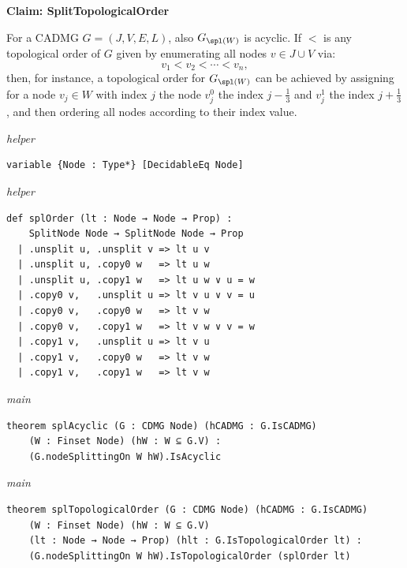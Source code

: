 \noindent\textbf{Claim: SplitTopologicalOrder}\par\smallskip
{\appendixTexSize
    For a CADMG $G=(J,V,E,L)$, also $G_{\spl(W)}$ is acyclic.
    If $<$ is any topological order of $G$ given by enumerating all nodes $v \in J \cup V$ via:
    \[ v_1 < v_2 < \cdots < v_n,\]
    then, for instance, 
    a topological order for $G_{\spl(W)}$ can be achieved by assigning for a node $v_j \in W$ with index $j$ the node 
    $v_j^0$ the index $j-\frac{1}{3}$
    and $v_j^1$ the index $j+\frac{1}{3}$, and then ordering all nodes according to their index value.
\par}
\smallskip
{\small\textit{helper}}
\begin{verbatim}
variable {Node : Type*} [DecidableEq Node]
\end{verbatim}
{\small\textit{helper}}
\begin{verbatim}
def splOrder (lt : Node → Node → Prop) :
    SplitNode Node → SplitNode Node → Prop
  | .unsplit u, .unsplit v => lt u v
  | .unsplit u, .copy0 w   => lt u w
  | .unsplit u, .copy1 w   => lt u w ∨ u = w
  | .copy0 v,   .unsplit u => lt v u ∨ v = u
  | .copy0 v,   .copy0 w   => lt v w
  | .copy0 v,   .copy1 w   => lt v w ∨ v = w
  | .copy1 v,   .unsplit u => lt v u
  | .copy1 v,   .copy0 w   => lt v w
  | .copy1 v,   .copy1 w   => lt v w
\end{verbatim}
{\small\textit{main}}
\begin{verbatim}
theorem splAcyclic (G : CDMG Node) (hCADMG : G.IsCADMG)
    (W : Finset Node) (hW : W ⊆ G.V) :
    (G.nodeSplittingOn W hW).IsAcyclic
\end{verbatim}
{\small\textit{main}}
\begin{verbatim}
theorem splTopologicalOrder (G : CDMG Node) (hCADMG : G.IsCADMG)
    (W : Finset Node) (hW : W ⊆ G.V)
    (lt : Node → Node → Prop) (hlt : G.IsTopologicalOrder lt) :
    (G.nodeSplittingOn W hW).IsTopologicalOrder (splOrder lt)
\end{verbatim}
~%

\vspace{\appendixNotesGap}

